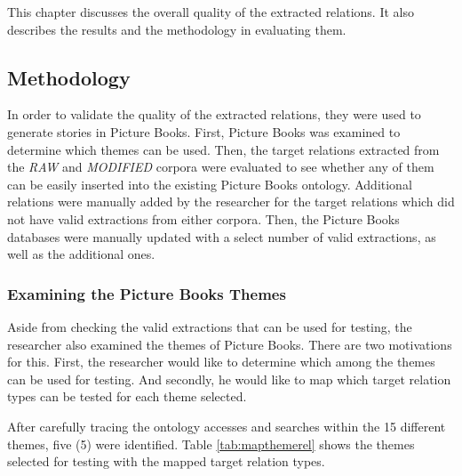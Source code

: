 %
%
%                 

\label{sec:resultsandanalysis}

This chapter discusses the overall quality of the extracted relations. It also describes the results and the methodology in evaluating them.

\subsection{Methodology}
\label{sec:methodology}

In order to validate the quality of the extracted relations, they were used to generate stories in Picture Books. First, Picture Books was examined to determine which themes can be used. Then, the target relations extracted from the \textit{RAW} and \textit{MODIFIED} corpora were evaluated to see whether any of them can be easily inserted into the existing Picture Books ontology. Additional relations were manually added by the researcher for the target relations which did not have valid extractions from either corpora. Then, the Picture Books databases were manually updated with a select number of valid extractions, as well as the additional ones. 

\subsubsection{Examining the Picture Books Themes}
\label{sec:examinethemes}

Aside from checking the valid extractions that can be used for testing, the researcher also examined the themes of Picture Books. There are two motivations for this. First, the researcher would like to determine which among the themes can be used for testing. And secondly, he would like to map which target relation types can be tested for each theme selected.

After carefully tracing the ontology accesses and searches within the 15 different themes, five (5) were identified. Table \ref{tab:mapthemerel} shows the themes selected for testing with the mapped target relation types.

